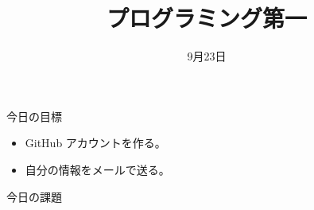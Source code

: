 \documentclass[a4paper]{article}
\title{プログラミング第一}
\date{9月23日}
\begin{document}
\maketitle

\noindent
今日の目標
\begin{itemize}
\item GitHub アカウントを作る。
\item 自分の情報をメールで送る。
\end{itemize}

\noindent
今日の課題
\begin{enumerate}
\end{enumerate}
\fi
\end{document}
